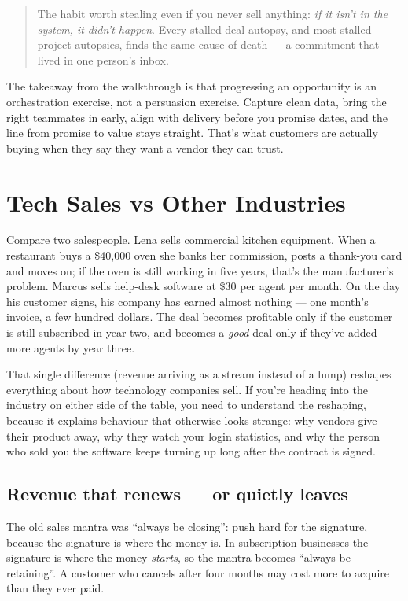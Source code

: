 \begin{quote}\small
The habit worth stealing even if you never sell anything: \emph{if it isn't in the system, it didn't happen}. Every stalled deal autopsy, and most stalled project autopsies, finds the same cause of death — a commitment that lived in one person's inbox.
\end{quote}


The takeaway from the walkthrough is that progressing an opportunity is an orchestration exercise, not a persuasion exercise. Capture clean data, bring the right teammates in early, align with delivery before you promise dates, and the line from promise to value stays straight. That's what customers are actually buying when they say they want a vendor they can trust.

\section{Tech Sales vs Other Industries}
Compare two salespeople. Lena sells commercial kitchen equipment. When a restaurant buys a \$40,000 oven she banks her commission, posts a thank-you card and moves on; if the oven is still working in five years, that's the manufacturer's problem. Marcus sells help-desk software at \$30 per agent per month. On the day his customer signs, his company has earned almost nothing — one month's invoice, a few hundred dollars. The deal becomes profitable only if the customer is still subscribed in year two, and becomes a \emph{good} deal only if they've added more agents by year three.


That single difference (revenue arriving as a stream instead of a lump) reshapes everything about how technology companies sell. If you're heading into the industry on either side of the table, you need to understand the reshaping, because it explains behaviour that otherwise looks strange: why vendors give their product away, why they watch your login statistics, and why the person who sold you the software keeps turning up long after the contract is signed.



\subsection{Revenue that renews — or quietly leaves}


The old sales mantra was ``always be closing'': push hard for the signature, because the signature is where the money is. In subscription businesses the signature is where the money \emph{starts}, so the mantra becomes ``always be retaining''. A customer who cancels after four months may cost more to acquire than they ever paid.


